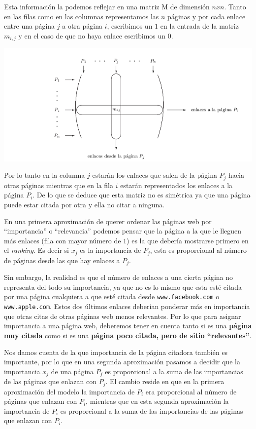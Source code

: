 \documentclass[size=a4, parskip=half, titlepage=false, toc=flat, toc=bib, 12pt]{scrartcl}
\theoremstyle{theorem-style}
\theoremstyle{definition-style}
\theoremstyle{remark-style}
\theoremstyle{example-style}
\theoremstyle{definition-style}
\theoremstyle{remark-style}
\begin{document}
Esta información la podemos reflejar en una matriz M de dimensión $nxn$. Tanto en las filas como en las columnas representamos las $n$ páginas y por cada enlace entre una página $j$ a otra página $i$, escribimos un $1$ en la entrada de la
matriz $m_{i,j}$ y en el caso de que no haya enlace escribimos un $0$.

\includegraphics[width=1.0\textwidth]{./img/matriz}

Por lo tanto en la columna $j$ estarán los enlaces que salen de la página $P_j$ hacia otras páginas
mientras que en la fila $i$ estarán representados los enlaces a la página $P_i$. De lo que se deduce que esta matriz
no es simétrica ya que una página puede estar citada por otra y ella no citar a ninguna.

En una primera aproximación de querer ordenar las páginas web por ``importancia'' o ``relevancia'' podemos
pensar que la página a la que le lleguen más enlaces (fila con mayor número de $1$) es la que debería
mostrarse primero en el \textit{ranking}. Es decir si $x_j$ es la importancia de $P_j$, esta es proporcional
al número de páginas desde las que hay enlaces a $P_j$.

Sin embargo, la realidad es que el número de enlaces a una cierta página no representa del todo su importancia,
ya que no es lo mismo que esta esté citada por una página cualquiera a que esté citada desde \verb|www.facebook.com| o
\verb|www.apple.com|. Estos dos últimos enlaces deberían ponderar más en importancia que otras citas de
otras páginas web menos relevantes. Por lo que para asignar importancia a una página web, deberemos tener
en cuenta tanto si es una \textbf{página muy citada} como si es una \textbf{página poco citada, pero de sitio ``relevantes''}.

Nos damos cuenta de la que importancia de la página citadora también es importante, por lo que en una segunda aproximación pasamos a decidir que la importancia $x_j$ de una página $P_j$ es proporcional a la suma de las importancias de las páginas que enlazan con $P_j$. El cambio reside en que en la primera aproximación del modelo la importancia de $P_i$ era proporcional al número de páginas que enlazan con $P_i$, mientras que en esta segunda aproximación la importancia de $P_i$ es proporcional a la suma de las importancias de las páginas que enlazan con $P_i$.
\end{document}
